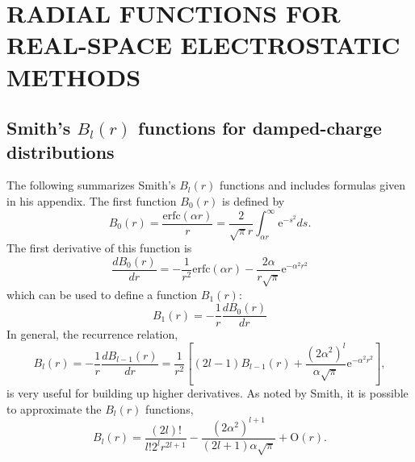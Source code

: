%
%
%
%
%
%
%
%

%
%

\chapter{RADIAL FUNCTIONS FOR REAL-SPACE ELECTROSTATIC METHODS}

\section{Smith's $B_l(r)$ functions for damped-charge distributions}
\label{SmithFunc}
The following summarizes Smith's $B_l(r)$ functions and includes
formulas given in his appendix.\cite{Smith98} The first function
$B_0(r)$ is defined by
%
\begin{equation}
B_0(r)=\frac{\text{erfc}(\alpha r)}{r} = \frac{2}{\sqrt{\pi}r}
\int_{\alpha r}^{\infty} \text{e}^{-s^2} ds .
\end{equation}
%
The first derivative of this function is
%
\begin{equation}
\frac{dB_0(r)}{dr}=-\frac{1}{r^2}\text{erfc}(\alpha r)
-\frac{2\alpha}{r\sqrt{\pi}}\text{e}^{-{\alpha}^2r^2}
\end{equation}
%
which can be used to define a function $B_1(r)$:
%
\begin{equation}
B_1(r)=-\frac{1}{r}\frac{dB_0(r)}{dr}
\end{equation}
%
In general, the recurrence relation,
\begin{equation}
B_l(r)=-\frac{1}{r}\frac{dB_{l-1}(r)}{dr} 
= \frac{1}{r^2} \left[ (2l-1)B_{l-1}(r) + \frac {(2\alpha^2)^l}{\alpha \sqrt{\pi}}
\text{e}^{-{\alpha}^2r^2}
\right] ,
\end{equation}
is very useful for building up higher derivatives. As noted by Smith,
it is possible to approximate the $B_l(r)$ functions,
%
\begin{equation}
B_l(r)=\frac{(2l)!}{l!2^lr^{2l+1}} - \frac {(2\alpha^2)^{l+1}}{(2l+1)\alpha \sqrt{\pi}}
+\text{O}(r) .
\end{equation}

